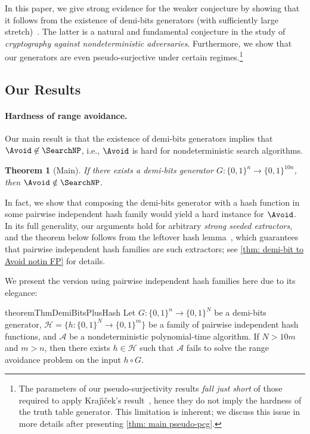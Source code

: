 \documentclass[10pt,a4paper]{article}
\newtheorem{theorem}{Theorem}[section]
\theoremstyle{definition}
\theoremstyle{remark}
\newcommand{\calA}{\mathcal{A}}
\newcommand{\calH}{\mathcal{H}}
\newcommand{\Krajicek}{Kraj\'{\i}\v{c}ek\xspace}
\begin{document}
In this paper, we give strong evidence for the weaker conjecture by showing that it follows from the existence of demi-bits generators (with sufficiently large stretch)~\cite{Rudich97}. The latter is a natural and fundamental conjecture in the study of \emph{cryptography against nondeterministic adversaries}. Furthermore, we show that our generators are even pseudo-surjective under certain regimes.\footnote{The parameters of our pseudo-surjectivity results \emph{fall just short} of those required to apply \Krajicek's result~\cite{Krajicek04}, hence they do not imply the hardness of the truth table generator. This limitation is inherent; we discuss this issue in more details after presenting \autoref{thm: main pseudo-pcg}.} %



\subsection{Our Results}
\paragraph{Hardness of range avoidance.} Our main result is that the existence of demi-bits generators implies that $\Avoid\not\in\SearchNP$, i.e., $\Avoid$ is hard for nondeterministic search algorithms. %

\begin{theorem}[Main]\label{thm: main demi-bit to Avoid notin FP}
	If there exists a demi-bits generator $G: \{0, 1\}^n \to \{0, 1\}^{10n}$, then $\Avoid \notin \SearchNP$. %
\end{theorem}

In fact, we show that composing the demi-bits generator with a hash function in some pairwise independent hash family would yield a hard instance for $\Avoid$. In its full generality, our arguments hold for arbitrary \emph{strong seeded extractors}, and the theorem below follows from the leftover hash lemma~\cite{ILL89}, which guarantees that pairwise independent hash families are such extractors; see \autoref{thm: demi-bit to Avoid notin FP} for details. %



We present the version using pairwise independent hash families here due to its elegance:


\begin{restatable}{theorem}{ThmDemiBitsPlusHash}\label{thm: intro demi-bits plus hash}
    Let $G: \{0, 1\}^n \to \{0, 1\}^N$ be a demi-bits generator, $\calH = \{h: \{0, 1\}^N \to \{0, 1\}^m\}$ be a family of pairwise independent hash functions, and $\calA$ be a nondeterministic polynomial-time algorithm. If $N > 10m$ and $m > n$, then there exists $h\in \calH$ such that $\calA$ fails to solve the range avoidance problem on the input $h\circ G$.
\end{restatable}
\end{document}

